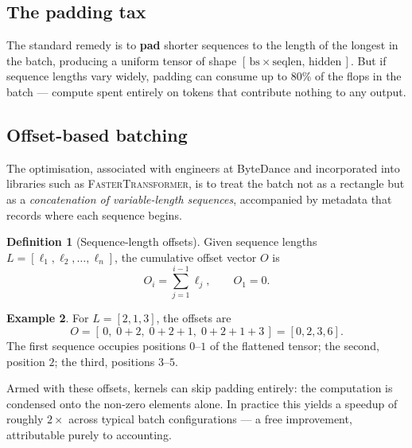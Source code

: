 \documentclass[11pt,a4paper]{article}
\theoremstyle{definition}
\newtheorem{definition}{Definition}[section]
\newtheorem{example}[definition]{Example}
\theoremstyle{plain}
\begin{document}
\subsection{The padding tax}

The standard remedy is to \textbf{pad} shorter sequences to the length of the longest in the batch, producing a uniform tensor of shape $[\,\text{bs}\times\text{seqlen},\,\text{hidden}\,]$. But if sequence lengths vary widely, padding can consume up to $80\%$ of the flops in the batch --- compute spent entirely on tokens that contribute nothing to any output.

\subsection{Offset-based batching}

The optimisation, associated with engineers at ByteDance and incorporated into libraries such as \textsc{FasterTransformer}, is to treat the batch not as a rectangle but as a \emph{concatenation of variable-length sequences}, accompanied by metadata that records where each sequence begins.

\begin{definition}[Sequence-length offsets]
Given sequence lengths $L = [\ell_1, \ell_2, \dots, \ell_n]$, the cumulative offset vector $O$ is
\[
O_i = \sum_{j=1}^{i-1} \ell_j, \qquad O_1 = 0.
\]
\end{definition}

\begin{example}
For $L = [2,1,3]$, the offsets are
\[
O = [\,0,\; 0+2,\; 0+2+1,\; 0+2+1+3\,] = [0,2,3,6].
\]
The first sequence occupies positions $0$--$1$ of the flattened tensor; the second, position $2$; the third, positions $3$--$5$.
\end{example}

Armed with these offsets, kernels can skip padding entirely: the computation is condensed onto the non-zero elements alone. In practice this yields a speedup of roughly $2\times$ across typical batch configurations --- a free improvement, attributable purely to accounting.
\end{document}
